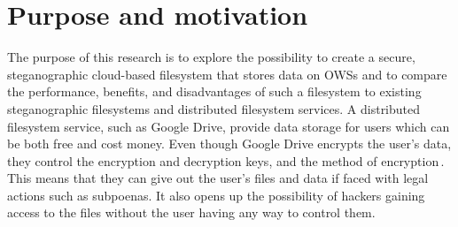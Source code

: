 
\section{Purpose and motivation}

The purpose of this research is to explore the possibility to create a secure, steganographic \mbox{cloud-based} filesystem that stores data on \gls{OWS}s and to compare the performance, benefits, and disadvantages of such a filesystem to existing steganographic filesystems and distributed filesystem services. A distributed filesystem service, such as Google Drive, provide data storage for users which can be both free and cost money. Even though Google Drive encrypts the user's data, they control the encryption and decryption keys, and the method of encryption\,\cite{johnsonGoogleDriveSecure2021}. This means that they can give out the user's files and data if faced with legal actions such as subpoenas. It also opens up the possibility of hackers gaining access to the files without the user having any way to control them.



